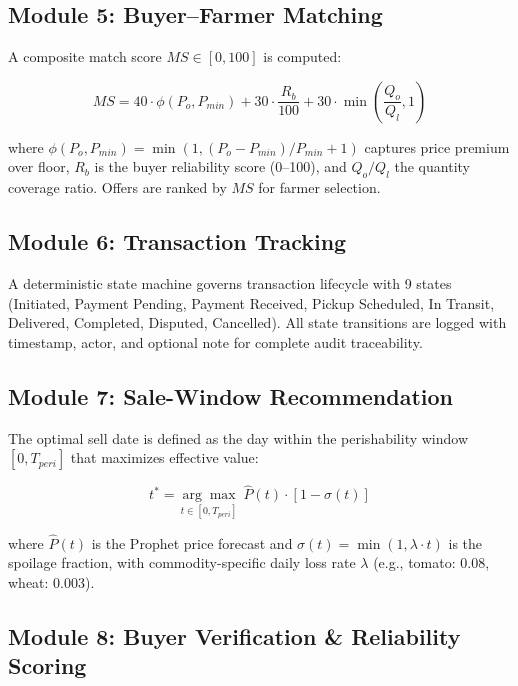 \documentclass[conference]{IEEEtran}
\begin{document}
\subsection{Module 5: Buyer–Farmer Matching}
\label{sec:module5}

A composite match score $MS \in [0, 100]$ is computed:

\begin{equation}
MS = 40 \cdot \phi(P_o, P_{min}) + 30 \cdot \frac{R_b}{100} + 30 \cdot \min\left(\frac{Q_o}{Q_l}, 1\right)
\end{equation}

where $\phi(P_o, P_{min}) = \min(1, (P_o - P_{min})/P_{min} + 1)$ captures price premium over floor, $R_b$ is the buyer reliability score (0–100), and $Q_o/Q_l$ the quantity coverage ratio. Offers are ranked by $MS$ for farmer selection.

\subsection{Module 6: Transaction Tracking}
A deterministic state machine governs transaction lifecycle with 9 states (Initiated, Payment Pending, Payment Received, Pickup Scheduled, In Transit, Delivered, Completed, Disputed, Cancelled). All state transitions are logged with timestamp, actor, and optional note for complete audit traceability.

\subsection{Module 7: Sale-Window Recommendation}
\label{sec:module7}

The optimal sell date is defined as the day within the perishability window $[0, T_{peri}]$ that maximizes effective value:

\begin{equation}
t^* = \underset{t \in [0, T_{peri}]}{\arg\max} \; \hat{P}(t) \cdot [1 - \sigma(t)]
\end{equation}

where $\hat{P}(t)$ is the Prophet price forecast and $\sigma(t) = \min(1, \lambda \cdot t)$ is the spoilage fraction, with commodity-specific daily loss rate $\lambda$ (e.g., tomato: 0.08, wheat: 0.003).

\subsection{Module 8: Buyer Verification \& Reliability Scoring}
\end{document}
